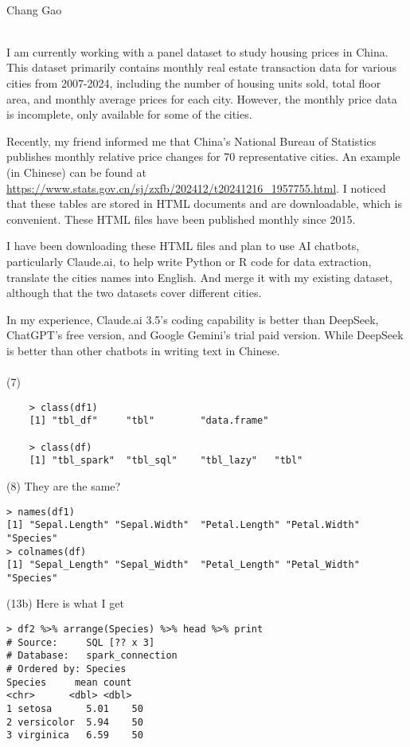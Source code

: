 \documentclass[12pt,letterpaper]{article}
\begin{document}
	\begin{center}
		\smallskip\\
		Chang Gao\smallskip\\
	\end{center}
	\smallskip\\
	I am currently working with a panel dataset to study housing prices in China. This dataset primarily contains monthly real estate transaction data for various cities from 2007-2024, including the number of housing units sold, total floor area, and monthly average prices for each city. However, the monthly price data is incomplete, only available for some of the cities.
	
	Recently, my friend informed me that China's National Bureau of Statistics publishes monthly relative price changes for 70 representative cities. An example (in Chinese) can be found at \url{https://www.stats.gov.cn/sj/zxfb/202412/t20241216_1957755.html}. I noticed that these tables are stored in HTML documents and are downloadable, which is convenient. These HTML files have been published monthly since 2015.

	I have been downloading these HTML files and plan to use AI chatbots, particularly Claude.ai, to help write Python or R code for data extraction, translate the cities names into English. And merge it with my existing dataset, although that the two datasets cover different cities.

	In my experience, Claude.ai 3.5's coding capability is better than DeepSeek, ChatGPT's free version, and Google Gemini's trial paid version. While DeepSeek is better than other chatbots in writing text in Chinese.\medskip\\
	\smallskip\\
	(7) 
\begin{verbatim}
	> class(df1)
	[1] "tbl_df"     "tbl"        "data.frame"
	
	> class(df)
	[1] "tbl_spark"  "tbl_sql"    "tbl_lazy"   "tbl"
\end{verbatim}
(8) They are the same?
\begin{verbatim}
> names(df1)
[1] "Sepal.Length" "Sepal.Width"  "Petal.Length" "Petal.Width"  "Species"     
> colnames(df)
[1] "Sepal_Length" "Sepal_Width"  "Petal_Length" "Petal_Width"  "Species"
\end{verbatim}
\newpage
\noindent (13b) Here is what I get
\begin{verbatim}
> df2 %>% arrange(Species) %>% head %>% print
# Source:     SQL [?? x 3]
# Database:   spark_connection
# Ordered by: Species
Species     mean count
<chr>      <dbl> <dbl>
1 setosa      5.01    50
2 versicolor  5.94    50
3 virginica   6.59    50
\end{verbatim}
\end{document}
